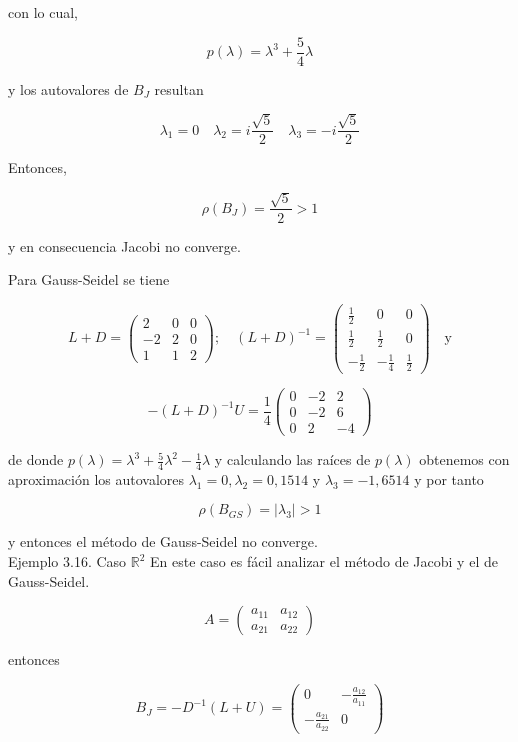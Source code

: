 \documentclass[10pt]{book}
\begin{document}
con lo cual,

$$
p(\lambda)=\lambda^{3}+\frac{5}{4} \lambda
$$

y los autovalores de $B_{J}$ resultan

$$
\lambda_{1}=0 \quad \lambda_{2}=i \frac{\sqrt{5}}{2} \quad \lambda_{3}=-i \frac{\sqrt{5}}{2}
$$

Entonces,

$$
\rho\left(B_{J}\right)=\frac{\sqrt{5}}{2}>1
$$

y en consecuencia Jacobi no converge.

Para Gauss-Seidel se tiene

$$
L+D=\left(\begin{array}{ccc}
2 & 0 & 0 \\
-2 & 2 & 0 \\
1 & 1 & 2
\end{array}\right) ; \quad(L+D)^{-1}=\left(\begin{array}{ccc}
\frac{1}{2} & 0 & 0 \\
\frac{1}{2} & \frac{1}{2} & 0 \\
-\frac{1}{2} & -\frac{1}{4} & \frac{1}{2}
\end{array}\right) \quad \mathrm{y}
$$

$$
-(L+D)^{-1} U=\frac{1}{4}\left(\begin{array}{ccc}
0 & -2 & 2 \\
0 & -2 & 6 \\
0 & 2 & -4
\end{array}\right)
$$

de donde $p(\lambda)=\lambda^{3}+\frac{5}{4} \lambda^{2}-\frac{1}{4} \lambda$ y calculando las raíces de $p(\lambda)$ obtenemos con aproximación los autovalores $\lambda_{1}=0, \lambda_{2}=0,1514$ y $\lambda_{3}=-1,6514$ y por tanto

$$
\rho\left(B_{G S}\right)=\left|\lambda_{3}\right|>1
$$

y entonces el método de Gauss-Seidel no converge.\\
Ejemplo 3.16. Caso $\mathbb{R}^{2}$ En este caso es fácil analizar el método de Jacobi y el de Gauss-Seidel.

$$
A=\left(\begin{array}{ll}
a_{11} & a_{12} \\
a_{21} & a_{22}
\end{array}\right)
$$

entonces

$$
B_{J}=-D^{-1}(L+U)=\left(\begin{array}{cc}
0 & -\frac{a_{12}}{a_{11}} \\
-\frac{a_{21}}{a_{22}} & 0
\end{array}\right)
$$
\end{document}

